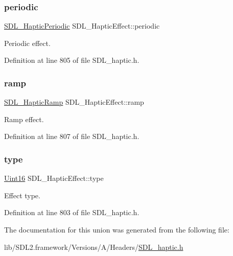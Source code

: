 \mbox{\label{union_s_d_l___haptic_effect_a8320ec4db6ec1dc1d30feb62ee2a2f04}} 
\subsubsection{\texorpdfstring{periodic}{periodic}}
{\footnotesize\ttfamily \mbox{\hyperlink{struct_s_d_l___haptic_periodic}{S\+D\+L\+\_\+\+Haptic\+Periodic}} S\+D\+L\+\_\+\+Haptic\+Effect\+::periodic}

Periodic effect. 

Definition at line 805 of file S\+D\+L\+\_\+haptic.\+h.

\mbox{\label{union_s_d_l___haptic_effect_a1d32ef4c2d1cc89dc938b392f6ad81bd}} 
\subsubsection{\texorpdfstring{ramp}{ramp}}
{\footnotesize\ttfamily \mbox{\hyperlink{struct_s_d_l___haptic_ramp}{S\+D\+L\+\_\+\+Haptic\+Ramp}} S\+D\+L\+\_\+\+Haptic\+Effect\+::ramp}

Ramp effect. 

Definition at line 807 of file S\+D\+L\+\_\+haptic.\+h.

\mbox{\label{union_s_d_l___haptic_effect_a5ff6cfd8da91537091e9a6c2108cb179}} 
\subsubsection{\texorpdfstring{type}{type}}
{\footnotesize\ttfamily \mbox{\hyperlink{_s_d_l__stdinc_8h_a31fcc0a076c9068668173ee26d33e42b}{Uint16}} S\+D\+L\+\_\+\+Haptic\+Effect\+::type}

Effect type. 

Definition at line 803 of file S\+D\+L\+\_\+haptic.\+h.



The documentation for this union was generated from the following file\+:\begin{DoxyCompactItemize}
\item 
lib/\+S\+D\+L2.\+framework/\+Versions/\+A/\+Headers/\mbox{\hyperlink{_s_d_l__haptic_8h}{S\+D\+L\+\_\+haptic.\+h}}\end{DoxyCompactItemize}
